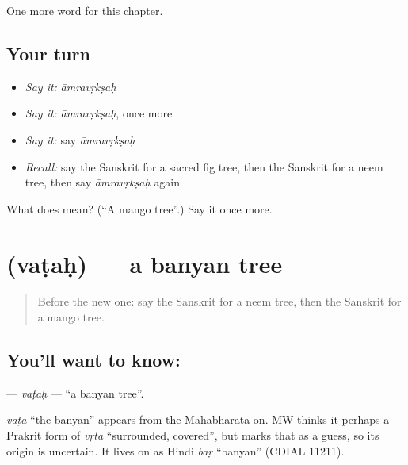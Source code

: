 \begin{grammarlens}[title={What you've built}]
One more word for this chapter.
\end{grammarlens}

\subsection*{Your turn}
\begin{itemize}
\raggedright
  \item \emph{Say it:} \emph{āmravṛkṣaḥ}
  \item \emph{Say it:} \emph{āmravṛkṣaḥ}, once more
  \item \emph{Say it:} say \emph{āmravṛkṣaḥ}
  \item \emph{Recall:} say the Sanskrit for a sacred fig tree, then the Sanskrit for a neem tree, then say \emph{āmravṛkṣaḥ} again
\end{itemize}

\begin{tcolorbox}[breakable,colback=teal!4,colframe=teal!35!black,title={Before you move on}]
What does  mean? (\textquotedblleft{}A mango tree\textquotedblright{}.) Say it once more.
\end{tcolorbox}
\section[\texorpdfstring{\sk{वटः} (vaṭaḥ)}{वटः (vaṭaḥ)}]{ (vaṭaḥ) — a banyan tree}

\label{lesson:SA-C166-vatah}



\begin{quote}
Before the new one: say the Sanskrit for a neem tree, then the Sanskrit for a mango tree.
\end{quote}

\subsection*{You'll want to know: }
\textbf{} — \emph{vaṭaḥ} — \textquotedblleft{}a banyan tree\textquotedblright{}.

\begin{cousinweb}
\emph{vaṭa} \textquotedblleft{}the banyan\textquotedblright{} appears from the Mahābhārata on. MW thinks it perhaps a Prakrit form of \emph{vṛta} \textquotedblleft{}surrounded, covered\textquotedblright{}, but marks that as a guess, so its origin is uncertain. It lives on as Hindi \emph{baṛ} \textquotedblleft{}banyan\textquotedblright{} (CDIAL 11211).
\end{cousinweb}

